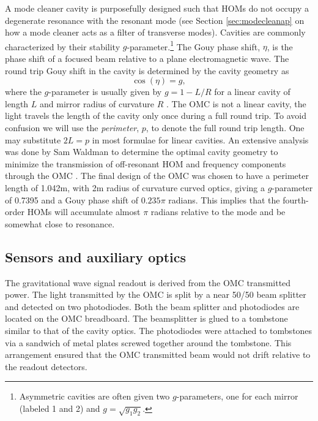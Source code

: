A mode cleaner cavity is purposefully designed such that HOMs do not occupy a degenerate resonance with the resonant  mode (see Section \ref{sec:modecleanap} on how a mode cleaner acts as a filter of transverse modes). %
Cavities are commonly characterized by their stability $g$-parameter.\footnote{Asymmetric cavities are often given two $g$-parameters, one for each mirror (labeled 1 and 2) and $g=\sqrt{g_1 g_2}$.} The Gouy phase shift, $\eta$, is the phase shift of a focused  beam relative to a plane electromagnetic wave. %
The round trip Gouy shift in the cavity is determined by the cavity geometry as
\begin{equation}
\label{eqn:gouyg}
\cos(\eta)=g,
\end{equation}
where the $g$-parameter is usually given by $g=1-L/R$ for a linear cavity of length $L$ and mirror radius of curvature $R$ \cite{T080208}. %
The OMC is not a linear cavity, the light travels the length of the cavity only once during a full round trip. %
To avoid confusion we will use the \emph{perimeter}, $p$, to denote the full round trip length. %
One may substitute $2L=p$ in most formulae for linear cavities. %
An extensive analysis was done by Sam Waldman to determine the optimal cavity geometry to minimize the transmission of off-resonant HOM and frequency components through the OMC \cite{T080144}. %
The final design of the OMC was chosen to have a perimeter length of 1.042m, with 2m radius of curvature curved optics, giving a $g$-parameter of 0.7395 and a Gouy phase shift of $0.235\pi$ radians. %
This implies that the fourth-order HOMs will accumulate almost $\pi$ radians relative to the  mode and be somewhat close to resonance.

\subsection{Sensors and auxiliary optics}

The gravitational wave signal readout is derived from the OMC transmitted power. %
The light transmitted by the OMC is split by a near 50/50 beam splitter and detected on two photodiodes. %
Both the beam splitter and photodiodes are located on the OMC breadboard. %
The beamsplitter is glued to a tombstone similar to that of the cavity optics. %
The photodiodes were attached to tombstones via a sandwich of metal plates screwed together around the tombstone. %
This arrangement ensured that the OMC transmitted beam would not drift relative to the readout detectors.

